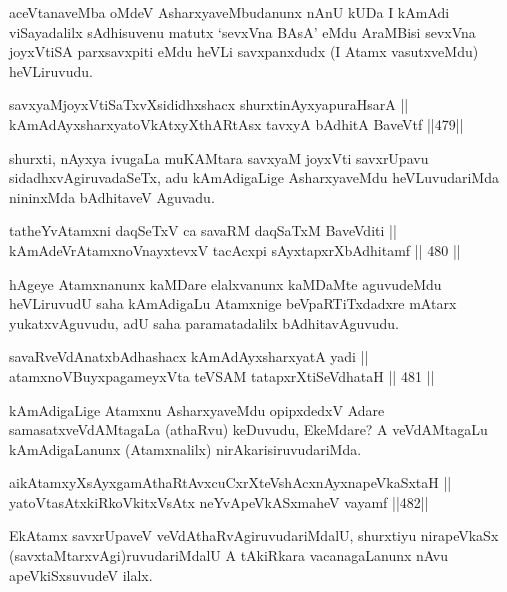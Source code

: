 \begin{artha}
aceVtanaveMba oMdeV AsharxyaveMbudanunx nAnU kUDa I kAmAdi
viSayadalilx sAdhisuvenu matutx `sevxVna BAsA' eMdu AraMBisi sevxVna
joyxVtiSA parxsavxpiti eMdu heVLi savxpanxdudx (I Atamx vasutxveMdu)
heVLiruvudu.
\end{artha}

\begin{shl}
savxyaMjoyxVtiSaTxvXsididhxshacx shurxtinAyxyapuraHsarA || \\
kAmAdAyxsharxyatoVkAtxyX\s thARtAsx tavxyA bAdhitA BaveVtf \hfill ||479||  
\end{shl}

\begin{artha}
shurxti, nAyxya ivugaLa muKAMtara savxyaM joyxVti savxrUpavu
sidadhxvAgiruvadaSeTx, adu kAmAdigaLige AsharxyaveMdu heVLuvudariMda
nininxMda bAdhitaveV Aguvadu.
\end{artha}

\begin{shl}
tatheYvA\s \s tamxni daqSeTxV ca savaRM daqSaTxM BaveVditi || \\
kAmAdeVrAtamxnoV\s nayxtevxV tacAcxpi sAyxtapxrXbAdhitamf \hfill || 480 ||  
\end{shl}

\begin{artha}
hAgeye Atamxnanunx kaMDare elalxvanunx kaMDaMte aguvudeMdu heVLiruvudU
saha kAmAdigaLu Atamxnige beVpaRTiTxdadxre mAtarx yukatxvAguvudu, adU
saha paramatadalilx bAdhitavAguvudu.
\end{artha}

\begin{shl}
savaRveVdAnatxbAdhashacx kAmAdAyxsharxyatA yadi ||  \\
atamxnoV\s BuyxpagameyxVta teVSAM tatapxrXtiSeVdhataH \hfill || 481 ||  
\end{shl}

\begin{artha}
kAmAdigaLige Atamxnu AsharxyaveMdu opipxdedxV Adare
samasatxveVdAMtagaLa (athaRvu) keDuvudu, EkeMdare? A veVdAMtagaLu
kAmAdigaLanunx (Atamxnalilx) nirAkarisiruvudariMda.
\end{artha}

\begin{shl}
aikAtamxyXsAyx\s \s gamAthaRtAvxcuCxrXteVshAcxnAyxnapeVkaSxtaH || \\
yatoV\s tasAtxkiRkoVkitxVsAtx neYvApeVkASxmaheV vayamf \hfill ||482||  
\end{shl}

\begin{artha}
EkAtamx savxrUpaveV veVdAthaRvAgiruvudariMdalU, shurxtiyu nirapeVkaSx
(savxtaMtarxvAgi)ruvudariMdalU A tAkiRkara vacanagaLanunx nAvu
apeVkiSxsuvudeV ilalx.
\end{artha}

